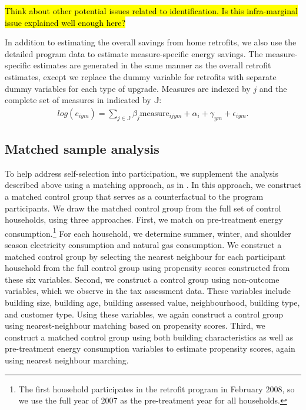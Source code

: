 \documentclass{article}
\newcommand{\hlc}[2][yellow]{ {\sethlcolor{#1} \hl{#2}} }
\begin{document}
\hlc{Think about other potential issues related to identification. Is this infra-marginal issue explained well enough here?}



In addition to estimating the overall savings from home retrofits, we also use the detailed program data to estimate measure-specific energy savings. The measure-specific estimates are generated in the same manner as the overall retrofit estimates, except we replace the dummy variable for retrofits with separate dummy variables for each type of upgrade. Measures are indexed by $j$ and the complete set of measures in indicated by $\mathbb{J}$:
\begin{align}
	log(e_{iym}) = \sum_{j \in \mathbb{J}} \beta_j \text{measure}_{ijym} + \alpha_i + \gamma_{ym} + \epsilon_{iym}.
	\label{eq:mbm}
\end{align}


\subsection{Matched sample analysis}\label{sec:match}

To help address self-selection into participation, we supplement the analysis described above using a matching approach, as in \cite{chuang2022residential}. In this approach, we construct a matched control group that serves as a counterfactual to the program participants. We draw the matched control group from the full set of control households, using three approaches.  First, we match on pre-treatment energy consumption.\footnote{The first household participates in the retrofit program in February 2008, so we use the full year of 2007 as the pre-treatment year for all households.} For each household, we determine summer, winter, and shoulder season electricity consumption and natural gas consumption. We construct a matched control group by selecting the nearest neighbour for each participant household from the full control group using propensity scores constructed from these six variables.  Second, we construct a control group using non-outcome variables, which we observe in the tax assessment data.  These variables include building size, building age, building assessed value, neighbourhood, building type, and customer type. Using these variables, we again construct a control group using nearest-neighbour matching based on propensity scores.  Third, we construct a matched control group using both building characteristics as well as pre-treatment energy consumption variables to estimate propensity scores, again using nearest neighbour marching.
\end{document}

